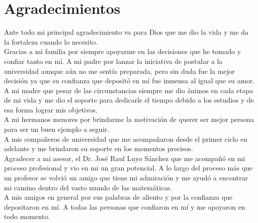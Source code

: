 
\chapter*{Agradecimientos}
Ante todo mi principal agradecimiento va para Dios que me dio la vida y me da la fortaleza cuando lo necesito.\\

Gracias a mi familia por siempre apoyarme en las decisiones que he tomado y confiar tanto en mí. A mi padre por lanzar la iniciativa de postular a la universidad aunque aún no me sentía preparada, pero sin duda fue la mejor decisión ya que su confianza que depositó en mí fue inmensa al igual que su amor. A mi madre que pesar de las circunstancias siempre me dio ánimos en cada etapa de mi vida y me dio el soporte para dedicarle el tiempo debido a los estudios y de esa forma lograr mis objetivos.\\

A mi hermanos menores por brindarme la motivación de querer ser mejor persona para ser un buen ejemplo a seguir.\\

A mis compañeros de universidad que me acompañaron desde el primer ciclo en adelante y me brindaron su soporte en los momentos precisos.\\

Agradecer a mi asesor, el Dr. José Raul Luyo Sánchez que me acompañó en mi proceso profesional y vio en mi un gran potencial. A lo largo del proceso más que un profesor se volvió un amigo que tiene mi admiración y me ayudó a encontrar mi camino dentro del vasto mundo de las matemáticas.\\

A mis amigos en general por sus palabras de aliento y por la confianza que depositaron en mí.
A todas las personas que confiaron en mí y me apoyaron en todo momento.